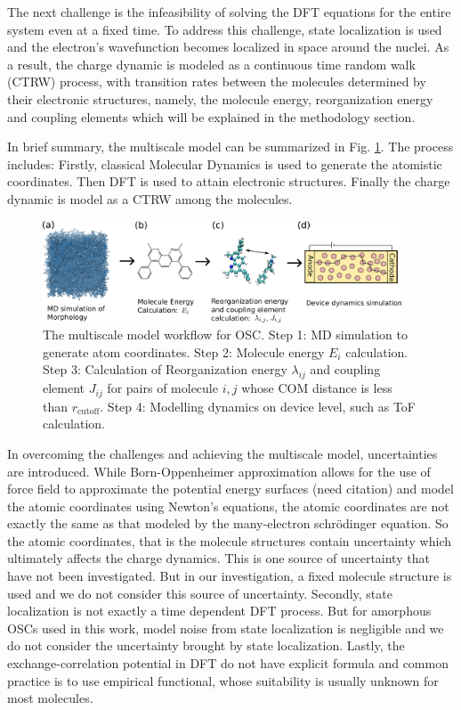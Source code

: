 \documentclass[letterpaper,12pt]{article}
\begin{document}
The next challenge is the infeasibility of solving the DFT equations for the entire system even at a fixed time. To address this challenge, state localization is used and the electron's wavefunction becomes localized in space around the nuclei. As a result, the charge dynamic is modeled as a continuous time random walk (CTRW) process, with transition rates between the molecules determined by their electronic structures, namely, the molecule energy, reorganization energy and coupling elements which will be explained in the methodology section. 

In brief summary, the multiscale model can be summarized in Fig. \ref{fig:MSM}.
The process includes: Firstly, classical Molecular Dynamics is used to generate the atomistic coordinates. Then DFT is used to attain electronic structures. Finally the charge dynamic is model as a CTRW among the molecules.

\begin{figure}[h]
    \centering
    \includegraphics[width=0.95\textwidth]{figs/MSM.png}
    \caption{The multiscale model workflow for OSC. Step 1: MD simulation to generate atom coordinates. Step 2: Molecule energy $E_i$ calculation. Step 3: Calculation of Reorganization energy $\lambda_{ij}$ and coupling element $J_{ij}$ for pairs of molecule $i,j$ whose COM distance is less than $r_\text{cutoff}$. Step 4: Modelling dynamics on device level, such as ToF calculation.}
    \label{fig:MSM}
\end{figure}

In overcoming the challenges and achieving the multiscale model, uncertainties are introduced. 
While Born-Oppenheimer approximation allows for the use of force field to approximate the potential energy surfaces (need citation) and model the atomic coordinates using Newton’s equations, the atomic coordinates are not exactly the same as that modeled by the many-electron schr\"{o}dinger equation.
So the atomic coordinates, that is the molecule structures contain uncertainty which ultimately affects the charge dynamics. 
This is one source of uncertainty that have not been investigated.
But in our investigation, a fixed molecule structure is used and we do not consider this source of uncertainty. 
Secondly, state localization is not exactly a time dependent DFT process. 
But for amorphous OSCs used in this work, model noise from state localization is negligible and we do not consider the uncertainty brought by state localization.
Lastly, the exchange-correlation potential in DFT do not have explicit formula and common practice is to use empirical functional, whose suitability is usually unknown for most molecules.
\end{document}
